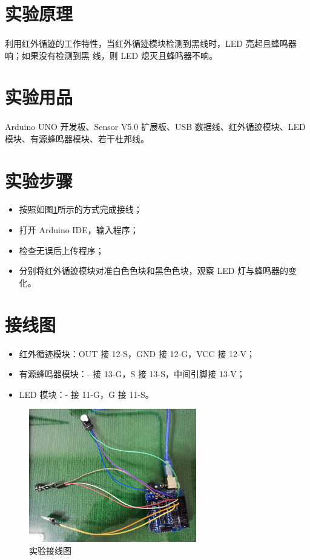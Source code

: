 \documentclass[UTF8, oneside]{ctexbook}
\begin{document}
\section{实验原理}
\paragraph{}
利用红外循迹的工作特性，当红外循迹模块检测到黑线时，LED 亮起且蜂鸣器响；如果没有检测到黑
线，则 LED 熄灭且蜂鸣器不响。

\section{实验用品}
\paragraph{}
Arduino UNO 开发板、Sensor V5.0 扩展板、USB 数据线、红外循迹模块、LED 模块、有源蜂鸣器模块、若干杜邦线。

\section{实验步骤}
\begin{itemize}
    \item[(1)] 按照如图\ref{s12_line}所示的方式完成接线；
    \item[(2)] 打开 Arduino IDE，输入程序；
    \item[(3)] 检查无误后上传程序；
    \item[(4)] 分别将红外循迹模块对准白色色块和黑色色块，观察 LED 灯与蜂鸣器的变化。
\end{itemize}

\section{接线图}
\begin{itemize}
    \item 红外循迹模块：OUT 接 12-S，GND 接 12-G，VCC 接 12-V；
    \item 有源蜂鸣器模块：- 接 13-G，S 接 13-S，中间引脚接 13-V；
    \item LED 模块：- 接 11-G，G 接 11-S。
\end{itemize}
\begin{figure}[h]
    \centering
    \includegraphics[width=0.65\textwidth]{./result/sensor/12/lines2.jpg}
    \caption{实验接线图}
    \label{s12_line}
\end{figure}
\end{document}
